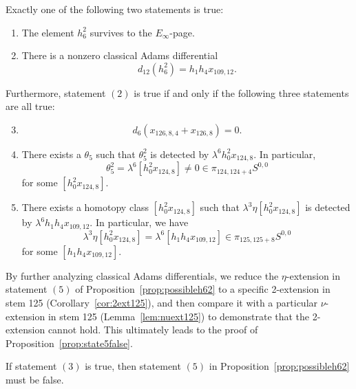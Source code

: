 \begin{proposition} \label{prop:possibleh62}
Exactly one of the following two statements is true:
\begin{enumerate}
    \item The element $h_6^2$ survives to the $E_\infty$-page.
   
    \item There is a nonzero classical Adams differential 
    $$d_{12}(h_6^2) = h_1h_4x_{109,12}.$$
\end{enumerate}
Furthermore, statement $(2)$ is true if and only if the following three statements are all true:
\begin{enumerate} \setcounter{enumi}{2}
    \item \leavevmode\vspace*{-\dimexpr\abovedisplayskip + \baselineskip}  
    $$d_6(x_{126,8,4} + x_{126,8}) = 0.$$
    
    \item There exists a $\theta_5$ such that 
    $\theta_5^2$ is detected by $\lambda^6 h_0^2x_{124,8}$. In particular, 
    $$\theta_5^2 = \lambda^6 [h_0^2x_{124,8}] \neq 0 \in \pi_{124,124+4}S^{0,0}$$
    for some $[h_0^2x_{124,8}]$.

    \item There exists a homotopy class $[h_0^2x_{124,8}]$ such that
    $\lambda^3 \eta [h_0^2x_{124,8}]$ is detected by $\lambda^6 h_1h_4x_{109,12}$. In particular, we have 
    $$\lambda^3 \eta [h_0^2x_{124,8}] = \lambda^6 [h_1h_4x_{109,12}] \in \pi_{125,125+8} S^{0,0}$$
    for some $[h_1h_4x_{109,12}]$.
\end{enumerate}
\end{proposition}

By further analyzing classical Adams differentials, we reduce the $\eta$-extension in statement $(5)$ of Proposition~\ref{prop:possibleh62} to a specific 2-extension in stem 125 (Corollary~\ref{cor:2ext125}), and then compare it with a particular $\nu$-extension in stem 125 (Lemma~\ref{lem:nuext125}) to demonstrate that the 2-extension cannot hold. This ultimately leads to the proof of Proposition~\ref{prop:state5false}.

\begin{proposition} \label{prop:state5false}
    If statement $(3)$ is true, then statement $(5)$ in Proposition~\ref{prop:possibleh62} must be false.
\end{proposition}

